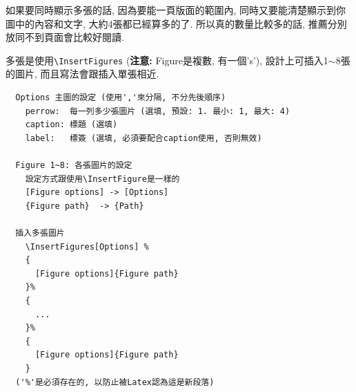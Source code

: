 \newpage
{}

  如果要同時顯示多張的話, 因為要能一頁版面的範圍內, 同時又要能清楚顯示到你圖中的內容和文字, 大約4張都已經算多的了. 所以真的數量比較多的話, 推薦分別放同不到頁面會比較好閱讀.

  多張是使用\verb|\InsertFigures| ({\bf 注意:} Figure是複數, 有一個's'), 設計上可插入1$\sim$8張的圖片, 而且寫法會跟插入單張相近.

  \EmptyLine
  \begin{fmpage}{\textwidth}
  \begin{verbatim}
  Options 主圖的設定 (使用','來分隔, 不分先後順序)
    perrow:  每一列多少張圖片 (選填, 預設: 1. 最小: 1, 最大: 4)
    caption: 標題 (選填)
    label:   標簽 (選填, 必須要配合caption使用, 否則無效)

  Figure 1~8: 各張圖片的設定
    設定方式跟使用\InsertFigure是一樣的
    [Figure options] -> [Options]
    {Figure path}  -> {Path}

  插入多張圖片
    \InsertFigures[Options] %
    {
      [Figure options]{Figure path}
    }%
    {
      ...
    }%
    {
      [Figure options]{Figure path}
    }
  ('%'是必須存在的, 以防止被Latex認為這是新段落)
  \end{verbatim}
  \end{fmpage}

  \newpage

